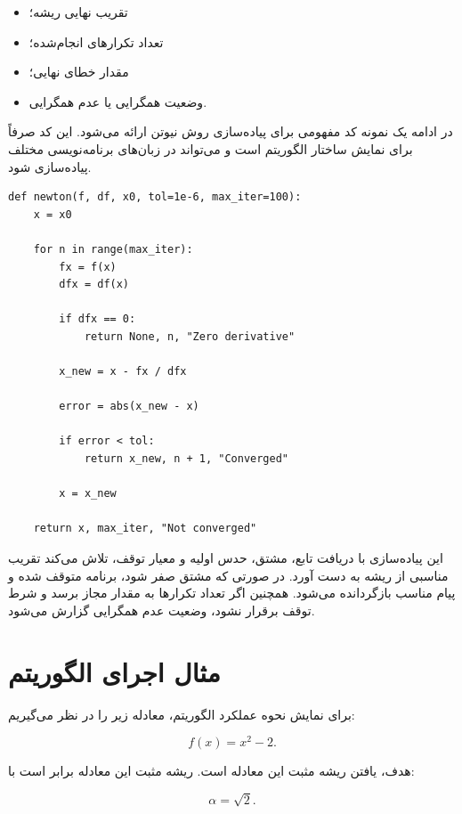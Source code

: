 \begin{itemize}
    \item تقریب نهایی ریشه؛
    \item تعداد تکرارهای انجام‌شده؛
    \item مقدار خطای نهایی؛
    \item وضعیت همگرایی یا عدم همگرایی.
\end{itemize}

در ادامه یک نمونه کد مفهومی برای پیاده‌سازی روش نیوتن ارائه می‌شود. این کد صرفاً برای نمایش ساختار الگوریتم است و می‌تواند در زبان‌های برنامه‌نویسی مختلف پیاده‌سازی شود.

\begin{latin}
\begin{verbatim}
def newton(f, df, x0, tol=1e-6, max_iter=100):
    x = x0

    for n in range(max_iter):
        fx = f(x)
        dfx = df(x)

        if dfx == 0:
            return None, n, "Zero derivative"

        x_new = x - fx / dfx

        error = abs(x_new - x)

        if error < tol:
            return x_new, n + 1, "Converged"

        x = x_new

    return x, max_iter, "Not converged"
\end{verbatim}
\end{latin}

این پیاده‌سازی با دریافت تابع، مشتق، حدس اولیه و معیار توقف، تلاش می‌کند تقریب مناسبی از ریشه به دست آورد. در صورتی که مشتق صفر شود، برنامه متوقف شده و پیام مناسب بازگردانده می‌شود. همچنین اگر تعداد تکرارها به مقدار مجاز برسد و شرط توقف برقرار نشود، وضعیت عدم همگرایی گزارش می‌شود.

\section{مثال اجرای الگوریتم}

برای نمایش نحوه عملکرد الگوریتم، معادله زیر را در نظر می‌گیریم:

\begin{equation}
f(x)=x^2-2.
\label{eq:example-function-ch3}
\end{equation}

هدف، یافتن ریشه مثبت این معادله است. ریشه مثبت این معادله برابر است با:

\begin{equation}
\alpha=\sqrt{2}.
\label{eq:sqrt2-root-ch3}
\end{equation}

